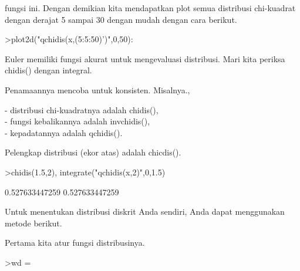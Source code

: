 \documentclass[a4paper,10pt]{article}
\begin{document}
\begin{eulernotebook}
\begin{eulercomment}
\begin{eulercomment}
\begin{eulercomment}
\begin{eulercomment}
\begin{eulercomment}
\begin{eulercomment}
\begin{eulercomment}
\begin{eulercomment}
\begin{eulercomment}
\begin{eulercomment}
\begin{eulercomment}
\begin{eulercomment}
\begin{eulercomment}
\begin{eulercomment}
\begin{eulercomment}
\begin{eulercomment}
\begin{eulercomment}
\begin{eulercomment}
\begin{eulercomment}
\begin{eulercomment}
\begin{eulercomment}
\begin{eulercomment}
\begin{eulercomment}
\begin{eulercomment}
\begin{eulercomment}
\begin{eulercomment}
\begin{eulercomment}
\begin{eulercomment}
\begin{eulercomment}
\begin{eulercomment}
\begin{eulercomment}
\begin{eulercomment}
\begin{eulercomment}
\begin{eulercomment}
\begin{eulercomment}
\begin{eulercomment}
\begin{eulercomment}
\begin{eulercomment}
\begin{eulercomment}
\begin{eulercomment}
\begin{eulercomment}
\begin{eulercomment}
\begin{eulercomment}
\begin{eulercomment}
\begin{eulercomment}
\begin{eulercomment}
\begin{eulercomment}
\begin{eulercomment}
\begin{eulercomment}
\begin{eulercomment}
\begin{eulercomment}
\begin{eulercomment}
\begin{eulercomment}
\begin{eulercomment}
\begin{eulercomment}
\begin{eulercomment}
\begin{eulercomment}
\begin{eulercomment}
\begin{eulercomment}
\begin{eulercomment}
\begin{eulercomment}
\begin{eulercomment}
\begin{eulercomment}
\begin{eulercomment}
\begin{eulercomment}
\begin{eulercomment}
\begin{eulercomment}
fungsi ini. Dengan demikian kita mendapatkan
plot semua distribusi chi-kuadrat dengan derajat 5 sampai 30 dengan
mudah dengan cara berikut.
\end{eulercomment}
\begin{eulerprompt}
>plot2d("qchidis(x,(5:5:50)')",0,50):
\end{eulerprompt}
\begin{eulercomment}
Euler memiliki fungsi akurat untuk mengevaluasi distribusi. Mari kita
periksa chidis() dengan integral.

Penamaannya mencoba untuk konsisten. Misalnya.,

- distribusi chi-kuadratnya adalah chidis(),\\
- fungsi kebalikannya adalah invchidis(),\\
- kepadatannya adalah qchidis().

Pelengkap distribusi (ekor atas) adalah chicdis().
\end{eulercomment}
\begin{eulerprompt}
>chidis(1.5,2), integrate("qchidis(x,2)",0,1.5)
\end{eulerprompt}
\begin{euleroutput}
  0.527633447259
  0.527633447259
\end{euleroutput}
\begin{eulercomment}
Untuk menentukan distribusi diskrit Anda sendiri, Anda dapat
menggunakan metode berikut.

Pertama kita atur fungsi distribusinya.
\end{eulercomment}
\begin{eulerprompt}
>wd = 
\end{eulerprompt}
\end{eulercomment}
\end{eulercomment}
\end{eulercomment}
\end{eulercomment}
\end{eulercomment}
\end{eulercomment}
\end{eulercomment}
\end{eulercomment}
\end{eulercomment}
\end{eulercomment}
\end{eulercomment}
\end{eulercomment}
\end{eulercomment}
\end{eulercomment}
\end{eulercomment}
\end{eulercomment}
\end{eulercomment}
\end{eulercomment}
\end{eulercomment}
\end{eulercomment}
\end{eulercomment}
\end{eulercomment}
\end{eulercomment}
\end{eulercomment}
\end{eulercomment}
\end{eulercomment}
\end{eulercomment}
\end{eulercomment}
\end{eulercomment}
\end{eulercomment}
\end{eulercomment}
\end{eulercomment}
\end{eulercomment}
\end{eulercomment}
\end{eulercomment}
\end{eulercomment}
\end{eulercomment}
\end{eulercomment}
\end{eulercomment}
\end{eulercomment}
\end{eulercomment}
\end{eulercomment}
\end{eulercomment}
\end{eulercomment}
\end{eulercomment}
\end{eulercomment}
\end{eulercomment}
\end{eulercomment}
\end{eulercomment}
\end{eulercomment}
\end{eulercomment}
\end{eulercomment}
\end{eulercomment}
\end{eulercomment}
\end{eulercomment}
\end{eulercomment}
\end{eulercomment}
\end{eulercomment}
\end{eulercomment}
\end{eulercomment}
\end{eulercomment}
\end{eulercomment}
\end{eulercomment}
\end{eulercomment}
\end{eulercomment}
\end{eulercomment}
\end{eulernotebook}
\end{document}
